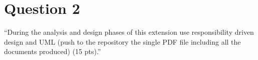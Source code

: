 \section{Question 2}

``During the analysis and design phases of this extension use responsibility driven design and UML (push to the repository the single PDF file including all the documents produced) (15 pts).''